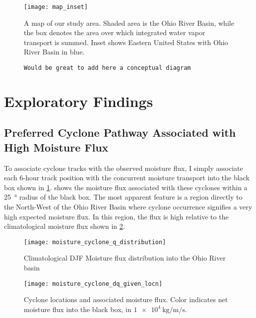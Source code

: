 \documentclass[12pt]{article}
\begin{document}
\begin{figure}
    \centering
    \texttt{[image: map\_inset]}
    \caption{A map of our study area. Shaded area is the Ohio River Basin, while the box denotes the area over which integrated water vapor transport is summed. Inset shows Eastern United States with Ohio River Basin in blue.}
    \label{fig:study-area}
\end{figure}
\begin{figure}
    \caption{\texttt{Would be great to add here a conceptual diagram}}
\end{figure}


\section{Exploratory Findings}

\subsection{Preferred Cyclone Pathway Associated with High Moisture Flux}

To associate cyclone tracks with the observed moisture flux, I simply associate each 6-hour track position with the concurrent moisture transport into the black box shown in \cref{fig:study-area}.
 shows the moisture flux associated with these cyclones within a \SI{25}{\degree} radius of the black box.
The most apparent feature is a region directly to the North-West of the Ohio River Basin where cyclone occurrence signifies a very high expected moisture flux.
In this region, the flux is high relative to the climatological moisture flux shown in \cref{fig:flux-distribution}.
\begin{figure}
    \centering
    \texttt{[image: moisture\_cyclone\_q\_distribution]}
    \caption{Climatological DJF Moisture flux distribution into the Ohio River basin}
    \label{fig:flux-distribution}
\end{figure}
\begin{figure}
    \centering
    \texttt{[image: moisture\_cyclone\_dq\_given\_locn]}
    \caption{Cyclone locations and associated moisture flux. Color indicates net moisture flux into the black box, in $\SI{1e4}{\kilo\gram\per\meter\per\second}$. }
    \label{fig:position-given-flux}
\end{figure}
\end{document}
